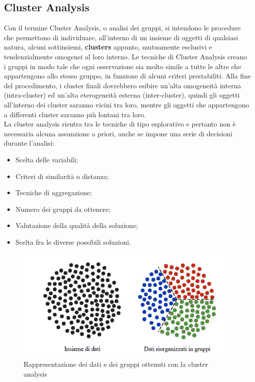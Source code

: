 \subsection{Cluster Analysis}
Con il termine Cluster Analysis, o analisi dei gruppi, si intendono le procedure che permettono di individuare, all'interno di un insieme di oggetti di qualsiasi natura, alcuni sottinsiemi, \textbf{clusters} appunto, mutuamente esclusivi e tendenzialmente omogenei al loro interno. Le tecniche di Cluster Analysis creano i gruppi in modo tale che ogni osservazione sia molto simile a tutte le altre che appartengono allo stesso gruppo, in funzione di alcuni criteri prestabiliti. Alla fine del procedimento, i cluster finali dovrebbero esibire un'alta omogeneità interna (intra-cluster) ed un'alta eterogeneità esterna (inter-cluster), quindi gli oggetti all'interno dei cluster saranno vicini tra loro, mentre gli oggetti che appartengono a differenti cluster saranno più lontani tra loro.\\
La cluster analysis rientra tra le tecniche di tipo esplorativo e pertanto non è necessaria alcuna assunzione a priori, anche se impone una serie di decisioni durante l'analisi:
\begin{itemize}
	\item Scelta delle variabili;
	\item Criteri di similarità o distanza;
	\item Tecniche di aggregazione;
	\item Numero dei gruppi da ottenere;
	\item Valutazione della qualità della soluzione;
	\item Scelta fra le diverse possibili soluzioni.
\end{itemize}
\begin{figure}[]
	\centering
	\includegraphics[scale=0.8]{images/Esempio_Cluster.png}
	\caption{Rappresentazione dei dati e dei gruppi ottenuti con la cluster analysis}
\end{figure}
